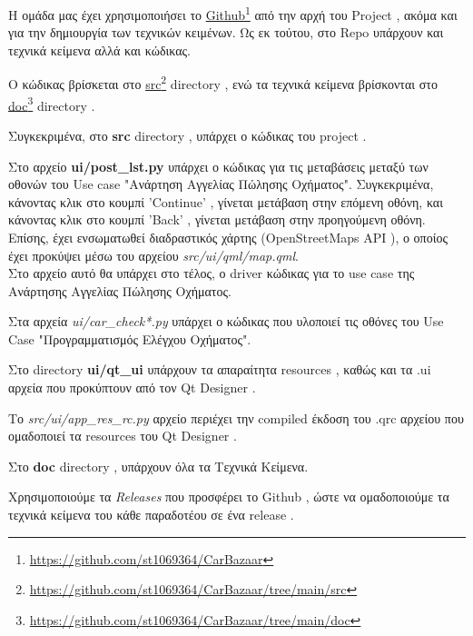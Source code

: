 \documentclass{../ol-softwaremanual}
\newcommand{\doclink}[2]{\href{#1}{#2}\footnote{\url{#1}}}
\begin{document}
	\flushleft
	
	Η ομάδα μας έχει χρησιμοποιήσει το \en \doclink{https://github.com/st1069364/CarBazaar}{Github} \gr από την αρχή του \en Project \gr, ακόμα και για την δημιουργία των τεχνικών κειμένων. Ως εκ τούτου, στο \en Repo \gr υπάρχουν και τεχνικά κείμενα αλλά και κώδικας. \break
	
	
	Ο κώδικας βρίσκεται στο \en \doclink{https://github.com/st1069364/CarBazaar/tree/main/src}{src} directory \gr, ενώ τα τεχνικά κείμενα βρίσκονται στο \en \doclink{https://github.com/st1069364/CarBazaar/tree/main/doc}{doc} directory \gr .\break
	
	Συγκεκριμένα, στο \en \textbf{src} directory \gr, υπάρχει ο κώδικας του \en project \gr. \break
	
	Στο αρχείο \en \textbf{ui/post\_lst.py} \gr υπάρχει ο κώδικας για τις μεταβάσεις μεταξύ των οθονών του \en Use case \gr \en"\gr Ανάρτηση Αγγελίας Πώλησης Οχήματος\en"\gr.  Συγκεκριμένα, κάνοντας κλικ στο κουμπί \en 'Continue' \gr , γίνεται μετάβαση στην επόμενη οθόνη, και κάνοντας κλικ στο κουμπί \en 'Back' \gr , γίνεται μετάβαση στην προηγούμενη οθόνη.
	Επίσης, έχει ενσωματωθεί διαδραστικός χάρτης (\en OpenStreetMaps API \gr), ο οποίος έχει προκύψει μέσω του αρχείου \en \textit{src/ui/qml/map.qml}\gr. \\
	
	Στο αρχείο αυτό θα υπάρχει στο τέλος, ο \en driver \gr κώδικας για το \en use case \gr της Ανάρτησης Αγγελίας Πώλησης Οχήματος. \break
	
	Στα αρχεία \en \textit{ui/car\_check*.py} \gr υπάρχει ο κώδικας που υλοποιεί τις οθόνες του \en Use Case "\gr Προγραμματισμός Ελέγχου Οχήματος\en"\gr. \break 
	
	\break
	
	Στο \en directory \textbf{ui/qt\_ui} \gr υπάρχουν τα απαραίτητα \en resources \gr, καθώς και τα \en .ui \gr αρχεία που προκύπτουν από τον \en Qt Designer \gr. \break	
	
	Το \en \textit{src/ui/app\_res\_rc.py} \gr αρχείο περιέχει την \en compiled \gr έκδοση του \en .qrc \gr αρχείου που ομαδοποιεί τα \en resources \gr του \en Qt Designer \gr.
	
	
	Στο \en \textbf{doc} directory \gr, υπάρχουν όλα τα Τεχνικά Κείμενα. \break
	
	Χρησιμοποιούμε τα \en \textit{Releases} \gr που προσφέρει το \en Github \gr, ώστε να ομαδοποιούμε τα τεχνικά κείμενα του κάθε παραδοτέου σε ένα \en release \gr .
	
	
	
	
	
	
	
	
	
	
\end{document}
